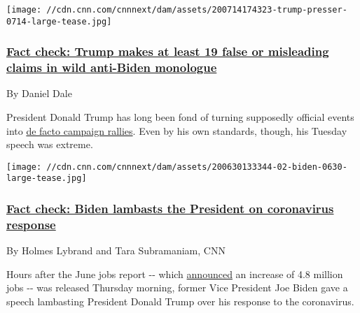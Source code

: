 \href{/2020/07/14/politics/fact-check-trump-biden-speech-rose-garden/index.html}{}

\texttt{[image: //cdn.cnn.com/cnnnext/dam/assets/200714174323-trump-presser-0714-large-tease.jpg]}

\hypertarget{fact-check-trump-makes-at-least-19-false-or-misleading-claims-in-wild-anti-biden-monologue-}{%
\subsubsection{\texorpdfstring{\href{/2020/07/14/politics/fact-check-trump-biden-speech-rose-garden/index.html}{Fact
check: Trump makes at least 19 false or misleading claims in wild
anti-Biden monologue
}}{Fact check: Trump makes at least 19 false or misleading claims in wild anti-Biden monologue }}\label{fact-check-trump-makes-at-least-19-false-or-misleading-claims-in-wild-anti-biden-monologue-}}

By Daniel Dale

President Donald Trump has long been fond of turning supposedly official
events into
\href{https://www.cnn.com/2020/03/23/politics/trump-coronavirus-briefings-rallies/index.html}{de
facto campaign rallies}. Even by his own standards, though, his Tuesday
speech was extreme.

\href{/2020/07/03/politics/joe-biden-attacks-donald-trump-on-coronavirus-fact-check/index.html}{}

\texttt{[image: //cdn.cnn.com/cnnnext/dam/assets/200630133344-02-biden-0630-large-tease.jpg]}

\hypertarget{fact-check-biden-lambasts-the-president-on-coronavirus-response-}{%
\subsubsection{\texorpdfstring{\href{/2020/07/03/politics/joe-biden-attacks-donald-trump-on-coronavirus-fact-check/index.html}{Fact
check: Biden lambasts the President on coronavirus response
}}{Fact check: Biden lambasts the President on coronavirus response }}\label{fact-check-biden-lambasts-the-president-on-coronavirus-response-}}

By Holmes Lybrand and Tara Subramaniam, CNN

Hours after the June jobs report -\/- which
\href{https://www.cnn.com/2020/07/02/economy/june-2020-jobs-report-coronavirus/index.html}{announced}
an increase of 4.8 million jobs -\/- was released Thursday morning,
former Vice President Joe Biden gave a speech lambasting President
Donald Trump over his response to the coronavirus.

